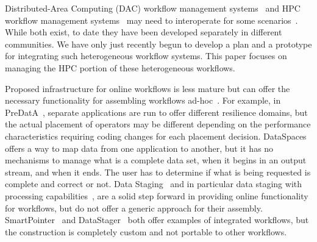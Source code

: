 Distributed-Area Computing
(DAC) workflow management
systems~\cite{tejedor:2015:pycompss,deelman:2015:pegasus} and HPC workflow
management systems~\cite{dorier:2015:in-situ-lessons} may need to interoperate
for some scenarios~\cite{deelman:2015:workflows-report}. While both exist, to
date they have been developed separately in different communities. We have only
just recently begun to develop a plan and a prototype for integrating such
heterogeneous workflow systems. This paper focuses on managing the HPC portion of
these heterogeneous workflows.
\fi



Proposed infrastructure for online workflows is less mature but can offer
the necessary functionality for assembling workflows
ad-hoc~\cite{zheng:2010:predata,docan:2010:dataspaces,wolf:2002:smartpointer,abbasi:2009:datastager}.
For example, in PreDatA~\cite{zheng:2010:predata}, separate applications are
run to offer different resilience domains, but the actual placement of
operators may be different depending on the performance characteristics requiring
coding changes for each placement decision.
DataSpaces~\cite{docan:2010:dataspaces} offers a way to map data from one
application to another, but it has no mechanisms to manage what is a complete
data set, when it begins in an output stream, and when it ends. The user has to
determine if what is being requested is complete and correct or not.
Data Staging~\cite{nisar:2008:staging} and in particular
data staging with processing
capabilities~\cite{abbasi:2009:datastager,ober:seismic}, are a solid step
forward in providing online functionality for workflows, but do not 
offer a generic approach for their assembly.
SmartPointer~\cite{wolf:2002:smartpointer} and
DataStager~\cite{abbasi:2009:datastager} both offer examples of integrated
workflows, but the construction is completely custom and not portable to other
workflows.

